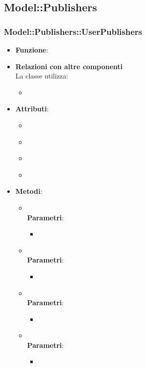 \subsection{Model::Publishers}
\subsubsection{Model::Publishers::UserPublishers}
\begin{itemize}
\item\textbf{Funzione}:
\item\textbf{Relazioni con altre componenti}\\
La classe utilizza:
	\begin{itemize}
		\item
	\end{itemize}
\item\textbf{Attributi}:
	\begin{itemize}
		\item\code{}\\
		\item\code{}\\
		\item\code{}\\
		\item\code{}\\
	\end{itemize}
\item\textbf{Metodi}:
	\begin{itemize}
		\item\code{}\\
		\textbf{Parametri}:
			\begin{itemize}
				\item\code{}\\
			\end{itemize}
		\item\code{}\\
		\textbf{Parametri}:
			\begin{itemize}
				\item\code{}\\
			\end{itemize}
		\item\code{}\\
		\textbf{Parametri}:
			\begin{itemize}
				\item\code{}\\
			\end{itemize}
		\item\code{}\\
		\textbf{Parametri}:
			\begin{itemize}
				\item\code{}\\
			\end{itemize}
	\end{itemize}
\end{itemize}

